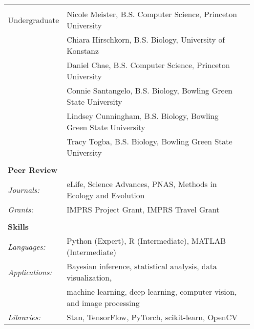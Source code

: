\documentclass[letterpaper,6pt,oneside]{article}
\begin{document}
\begin{small}
\begin{longtable}{@{} l p{5.3in}l}
 & \\
 \large{Undergraduate}
 & Nicole Meister, B.S. Computer Science, Princeton University \\
  & Chiara Hirschkorn, B.S. Biology, University of Konstanz \\
  & Daniel Chae, B.S. Computer Science, Princeton University \\
 &  Connie Santangelo, B.S. Biology, Bowling Green State University \\
 & Lindsey Cunningham, B.S. Biology, Bowling Green State University \\
 & Tracy Togba, B.S. Biology, Bowling Green State University \\
& \\

 \Large{\textbf{Peer Review}}  \vspace{5mm} \\
 \normalsize{\textit{Journals: }} & eLife, Science Advances, PNAS, Methods in Ecology and Evolution \vspace{1mm} \\
 \normalsize{\textit{Grants: }} & IMPRS Project Grant, IMPRS Travel Grant \vspace{1mm} \\
 & \\

\Large{\textbf{Skills}} \vspace{5mm} \\
\normalsize{\textit{Languages: }}
& Python (Expert), R (Intermediate), MATLAB (Intermediate) \vspace{1mm}\\ %
\normalsize{\textit{Applications: }} 
& Bayesian inference, statistical analysis, data visualization, \\ 
& machine learning, deep learning, computer vision, and image processing \vspace{1mm}\\
\normalsize{\textit{Libraries: }}
& Stan, TensorFlow, PyTorch, scikit-learn, OpenCV \\
\end{longtable}
\end{small}
\newpage
\end{document}
